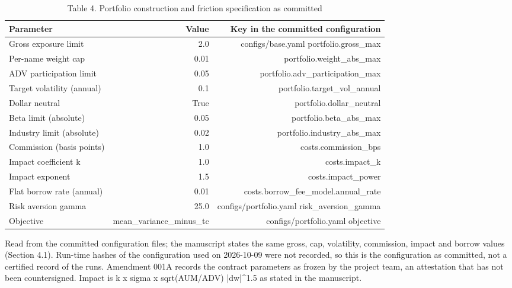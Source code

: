 \begin{table}[t]
\centering
\small
\caption{Table 4. Portfolio construction and friction specification as committed}
\label{tab:spec}
\begin{tabular}{lrr}
\toprule
Parameter & Value & Key in the committed configuration \\
\midrule
Gross exposure limit & 2.0 & configs/base.yaml portfolio.gross\_max \\
Per-name weight cap & 0.01 & portfolio.weight\_abs\_max \\
ADV participation limit & 0.05 & portfolio.adv\_participation\_max \\
Target volatility (annual) & 0.1 & portfolio.target\_vol\_annual \\
Dollar neutral & True & portfolio.dollar\_neutral \\
Beta limit (absolute) & 0.05 & portfolio.beta\_abs\_max \\
Industry limit (absolute) & 0.02 & portfolio.industry\_abs\_max \\
Commission (basis points) & 1.0 & costs.commission\_bps \\
Impact coefficient k & 1.0 & costs.impact\_k \\
Impact exponent & 1.5 & costs.impact\_power \\
Flat borrow rate (annual) & 0.01 & costs.borrow\_fee\_model.annual\_rate \\
Risk aversion gamma & 25.0 & configs/portfolio.yaml risk\_aversion\_gamma \\
Objective & mean\_variance\_minus\_tc & configs/portfolio.yaml objective \\
\bottomrule
\end{tabular}
\par\vspace{2pt}
\parbox{\textwidth}{\footnotesize Read from the committed configuration files; the manuscript states the same gross, cap, volatility, commission, impact and borrow values (Section 4.1). Run-time hashes of the configuration used on 2026-10-09 were not recorded, so this is the configuration as committed, not a certified record of the runs. Amendment 001A records the contract parameters as frozen by the project team, an attestation that has not been countersigned. Impact is k x sigma x sqrt(AUM/ADV) |dw|\textasciicircum{}1.5 as stated in the manuscript.}
\end{table}
